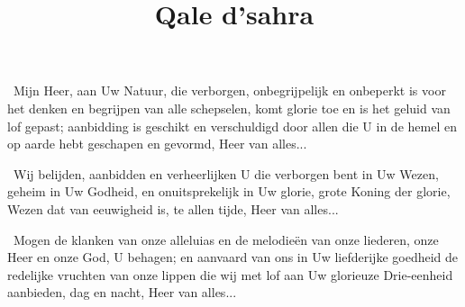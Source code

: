 \documentclass[12pt,twoside,a5paper]{article}
\begin{document}


\begin{halfparskip}
  \cc~Mijn Heer, aan Uw Natuur, die verborgen, onbegrijpelijk en onbeperkt is voor het denken en begrijpen van alle schepselen, komt glorie toe en is het geluid van lof gepast; aanbidding is geschikt en verschuldigd door allen die U in de hemel en op aarde hebt geschapen en gevormd, Heer van alles...
\end{halfparskip}



\begin{halfparskip}
   

  \cc~Wij belijden, aanbidden en verheerlijken U die verborgen bent in Uw Wezen, geheim in Uw Godheid, en onuitsprekelijk in Uw glorie, grote Koning der glorie, Wezen dat van eeuwigheid is, te allen tijde, Heer van alles...

   

  \cc~Mogen de klanken van onze alleluias en de melodieën van onze liederen, onze Heer en onze God, U behagen; en aanvaard van ons in Uw liefderijke goedheid de redelijke vruchten van onze lippen die wij met lof aan Uw glorieuze Drie-eenheid aanbieden, dag en nacht, Heer van alles...
\end{halfparskip}


\newpage
\title{Qale d'sahra}
\inlinemaketitle

\end{document}
